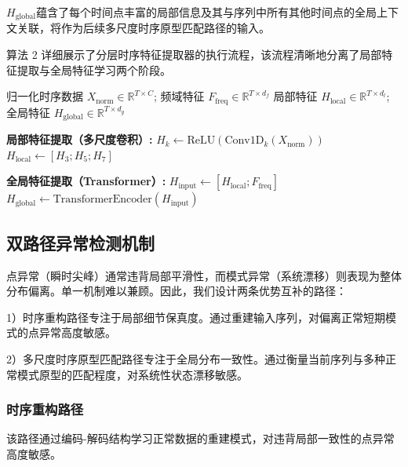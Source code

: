 \documentclass{setp-new}
\begin{document}
$H_{\text{global}}$蕴含了每个时间点丰富的局部信息及其与序列中所有其他时间点的全局上下文关联，将作为后续多尺度时序原型匹配路径的输入。

算法 2 详细展示了分层时序特征提取器的执行流程，该流程清晰地分离了局部特征提取与全局特征学习两个阶段。
\begin{algorithm}[H]
\caption{分层时序特征提取器}
\label{alg:hierarchical_feature_extractor}
\begin{algorithmic}[1]
\Require 归一化时序数据 $X_{\text{norm}} \in \mathbb{R}^{T \times C}$; 频域特征 $F_{\text{freq}} \in \mathbb{R}^{T \times d_f}$
\Ensure 局部特征 $H_{\text{local}} \in \mathbb{R}^{T \times d_l}$; 全局特征 $H_{\text{global}} \in \mathbb{R}^{T \times d_g}$

\State \textbf{局部特征提取（多尺度卷积）:}
 
    \State $H_k \gets \text{ReLU}(\text{Conv1D}_k(X_{\text{norm}}))$ 
\EndFor
\State $H_{\text{local}} \gets [H_3; H_5; H_7]$ 

\State \textbf{全局特征提取（Transformer）:}
\State $H_{\text{input}} \gets [H_{\text{local}}; F_{\text{freq}}]$ 
\State $H_{\text{global}} \gets \text{TransformerEncoder}(H_{\text{input}})$ 

\end{algorithmic}
\end{algorithm}

\subsection{双路径异常检测机制}

点异常（瞬时尖峰）通常违背局部平滑性，而模式异常（系统漂移）则表现为整体分布偏离。单一机制难以兼顾。因此，我们设计两条优势互补的路径：

1）时序重构路径专注于局部细节保真度。通过重建输入序列，对偏离正常短期模式的点异常高度敏感。

2）多尺度时序原型匹配路径专注于全局分布一致性。通过衡量当前序列与多种正常模式原型的匹配程度，对系统性状态漂移敏感。

\subsubsection{时序重构路径}
该路径通过编码-解码结构学习正常数据的重建模式，对违背局部一致性的点异常高度敏感。
\end{document}
